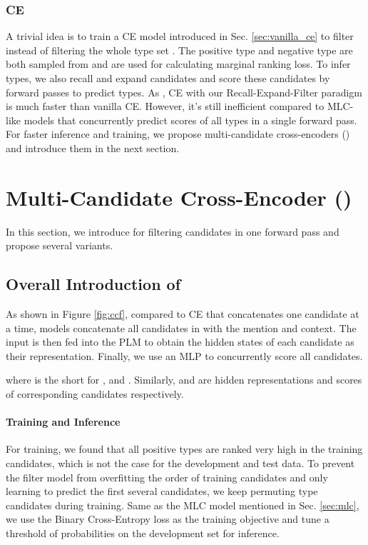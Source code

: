 \documentclass[11pt]{article}
\begin{document}
\subsubsection{CE} A trivial idea is to train a CE model introduced in Sec. \ref{sec:vanilla_ce} to filter  instead of filtering the whole type set . The positive type  and negative  type are both sampled from  and are used for calculating marginal ranking loss. To infer types, we also recall and expand  candidates and score these candidates by  forward passes to predict types. As , CE with our Recall-Expand-Filter paradigm is much faster than vanilla CE. However, it's still inefficient compared to MLC-like models that concurrently predict scores of all types in a single forward pass. For faster inference and training, we propose multi-candidate cross-encoders ({\bf \textsc{\name}}) and introduce them in the next section.

\section{Multi-Candidate Cross-Encoder (\name)}
\label{sec:ccf}
 In this section, we introduce {\bf \textsc{\name}} for filtering candidates in one forward pass and propose several variants. 
\subsection{Overall Introduction of \name}
As shown in Figure \ref{fig:ccf}, compared to CE that concatenates one candidate at a time, {\bf \textsc{\name}} models concatenate all candidates in  with the mention and context. The input is then fed into the PLM to obtain the hidden states of each candidate as their representation. Finally, we use an MLP to concurrently score all candidates.

where  is the short for , and . Similarly,  and  are hidden representations and scores of corresponding candidates respectively. 

\paragraph{Training and Inference} For training, we found that all positive types are ranked very high in the training candidates, which is not the case for the development and test data. To prevent the filter model from overfitting the order of training candidates and only learning to predict the first several candidates, we keep permuting type candidates during training. Same as the MLC model mentioned in Sec. \ref{sec:mlc}, we use the Binary Cross-Entropy loss as the training objective and tune a threshold of probabilities on the development set for inference.
\end{document}
